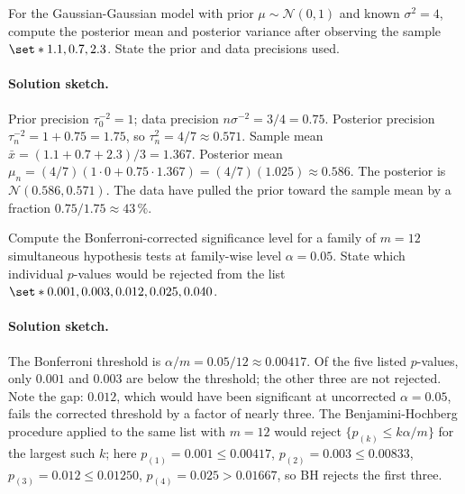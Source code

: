 \begin{exercise}
For the Gaussian-Gaussian model with prior $\mu \sim \mathcal{N}(0,
1)$ and known $\sigma^{2} = 4$, compute the posterior mean and
posterior variance after observing the sample $\set*{1.1, 0.7,
2.3}$. State the prior and data precisions used.

\paragraph{Solution sketch.} Prior precision $\tau_{0}^{-2} = 1$;
data precision $n\sigma^{-2} = 3/4 = 0.75$. Posterior precision
$\tau_{n}^{-2} = 1 + 0.75 = 1.75$, so $\tau_{n}^{2} = 4/7
\approx 0.571$. Sample mean $\bar{x} = (1.1 + 0.7 + 2.3)/3 =
1.367$. Posterior mean $\mu_{n} = (4/7)(1 \cdot 0 + 0.75 \cdot
1.367) = (4/7)(1.025) \approx 0.586$. The posterior is
$\mathcal{N}(0.586, 0.571)$. The data have pulled the prior toward
the sample mean by a fraction $0.75/1.75 \approx 43\,\%$.
\end{exercise}

\begin{exercise}
Compute the Bonferroni-corrected significance level for a family of
$m = 12$ simultaneous hypothesis tests at family-wise level $\alpha
= 0.05$. State which individual $p$-values would be rejected from
the list $\set*{0.001, 0.003, 0.012, 0.025, 0.040}$.

\paragraph{Solution sketch.} The Bonferroni threshold is
$\alpha/m = 0.05/12 \approx 0.00417$. Of the five listed
$p$-values, only $0.001$ and $0.003$ are below the threshold; the
other three are not rejected. Note the gap: $0.012$, which would
have been significant at uncorrected $\alpha = 0.05$, fails the
corrected threshold by a factor of nearly three. The
Benjamini-Hochberg procedure applied to the same list with
$m = 12$ would reject $\{p_{(k)} \leq k\alpha/m\}$ for the
largest such $k$; here $p_{(1)} = 0.001 \leq 0.00417$,
$p_{(2)} = 0.003 \leq 0.00833$, $p_{(3)} = 0.012 \leq 0.01250$,
$p_{(4)} = 0.025 > 0.01667$, so BH rejects the first three.
\end{exercise}


